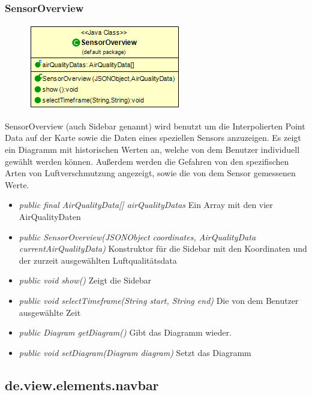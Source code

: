 \subsubsection{SensorOverview}
\begin{minipage}{0.3\textwidth}
    \begin{figure}[H]
        \includegraphics[scale = 0.5
        ]{media/view/map/SensorOverview_Class.png}
    \end{figure}
    \end{minipage} \hfill
    \begin{minipage}{0.6\textwidth}
SensorOverview (auch Sidebar genannt) wird benutzt um die Interpolierten Point Data auf der Karte sowie die Daten eines speziellen Sensors anzuzeigen. Es zeigt ein Diagramm mit historischen Werten an, welche von dem Benutzer individuell gewählt werden können. Außerdem werden die Gefahren von den spezifischen Arten von Luftverschmutzung angezeigt, sowie die von dem Sensor gemessenen Werte.
\end{minipage}
\begin{itemize} [noitemsep]
    \item \emph{public final AirQualityData[] airQualityDatas} Ein Array mit den vier AirQualityDaten
    \item \emph{public SensorOverview(JSONObject coordinates, AirQualityData currentAirQualityData)} Konstruktor für die Sidebar mit den Koordinaten und der zurzeit ausgewählten Luftqualitätsdata
    \item \emph{public void show()} Zeigt die Sidebar
    \item \emph{public void selectTimeframe(String start, String end)} Die von dem Benutzer ausgewählte Zeit
    \item \emph{public Diagram getDiagram()} Gibt das Diagramm wieder.
    \item \emph{public void setDiagram(Diagram diagram)} Setzt das Diagramm
\end{itemize}

\subsection{de.view.elements.navbar}

